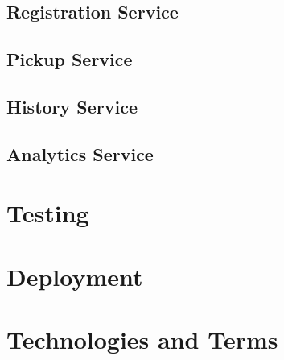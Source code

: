 \subsection{Registration Service}
\subsection{Pickup Service}
\subsection{History Service}
\subsection{Analytics Service}

\section{Testing}
\section{Deployment}

\section{Technologies and Terms}
